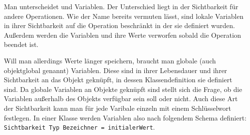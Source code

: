 \begin{Infobox}[Sichtbarkeit]
Man unterscheidet  und  Variablen.
Der Unterschied liegt in der Sichtbarkeit für andere Operationen.
Wie der Name bereits vermuten lässt, sind lokale Variablen in ihrer Sichtbarkeit auf die Operation beschränkt in der sie definiert wurden.
Außerdem werden die Variablen und ihre Werte verworfen sobald die Operation beendet ist.

Will man allerdings Werte länger speichern, braucht man globale (auch objektglobal genannt) Variablen.
Diese sind in ihrer Lebensdauer und ihrer Sichtbarkeit an das Objekt geknüpft, in dessen Klassendefinition sie definiert sind.
Da globale Variablen an Objekte geknüpft sind stellt sich die Frage, ob die Variablen außerhalb des Objekts verfügbar sein soll oder nicht.
Auch diese Art der Sichtbarkeit kann man für jede Varibale einzeln mit einem Schlüsselwort festlegen.
In einer Klasse werden Variablen also nach folgendem Schema definiert: \lstinline|Sichtbarkeit Typ Bezeichner = initialerWert|.
\end{Infobox}

\begin{Infobox}[Rechenoperationen]

\end{Infobox}
